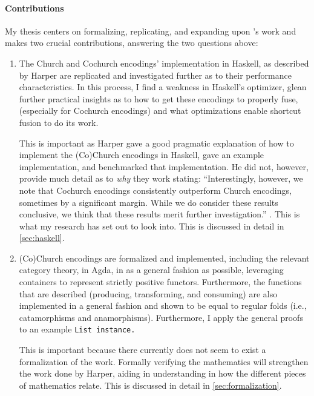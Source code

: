 \paragraph{Contributions}
My thesis centers on formalizing, replicating, and expanding upon \cite{Harper2011}'s work and makes two crucial contributions, answering the two questions above:
\begin{enumerate}
    \item The Church and Cochurch encodings' implementation in Haskell, as described by Harper are replicated and investigated further as to their performance characteristics.
    In this process, I find a weakness in Haskell's optimizer, glean further practical insights as to how to get these encodings to properly fuse, (especially for Cochurch encodings) and what optimizations enable shortcut fusion to do its work.

    This is important as Harper gave a good pragmatic explanation of how to implement the (Co)Church encodings in Haskell, gave an example implementation, and benchmarked that implementation.
    He did not, however, provide much detail as to \textit{why} they work stating: ``Interestingly, however, we note that Cochurch encodings consistently outperform Church encodings, sometimes by a significant margin. While we do consider these results conclusive, we think that these results merit further investigation.'' \citep{Harper2011}.
    This is what my research has set out to look into.
    This is discussed in detail in \autoref{sec:haskell}.
    \item (Co)Church encodings are formalized and implemented, including the relevant category theory, in Agda, in as a general fashion as possible, leveraging containers \citep{Abbott2005} to represent strictly positive functors.
    Furthermore, the functions that are described (producing, transforming, and consuming) are also implemented in a general fashion and shown to be equal to regular folds (i.e., catamorphisms and anamorphisms).
    Furthermore, I apply the general proofs to an example \tt{List} instance.

    This is important because there currently does not seem to exist a formalization of the work.
    Formally verifying the mathematics will strengthen the work done by Harper, aiding in understanding in how the different pieces of mathematics relate.
    This is discussed in detail in \autoref{sec:formalization}.
\end{enumerate}



